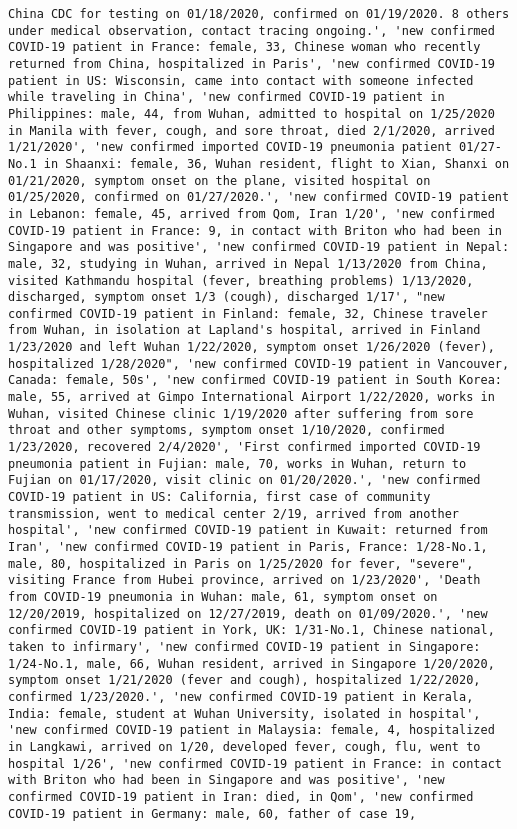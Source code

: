 \documentclass[11pt]{article}
\begin{document}
\begin{Verbatim}[commandchars=\\\{\}]
China CDC for testing on 01/18/2020, confirmed on 01/19/2020. 8 others under medical observation, contact tracing ongoing.', 'new confirmed COVID-19 patient in France: female, 33, Chinese woman who recently returned from China, hospitalized in Paris', 'new confirmed COVID-19 patient in US: Wisconsin, came into contact with someone infected while traveling in China', 'new confirmed COVID-19 patient in Philippines: male, 44, from Wuhan, admitted to hospital on 1/25/2020 in Manila with fever, cough, and sore throat, died 2/1/2020, arrived 1/21/2020', 'new confirmed imported COVID-19 pneumonia patient 01/27-No.1 in Shaanxi: female, 36, Wuhan resident, flight to Xian, Shanxi on 01/21/2020, symptom onset on the plane, visited hospital on 01/25/2020, confirmed on 01/27/2020.', 'new confirmed COVID-19 patient in Lebanon: female, 45, arrived from Qom, Iran 1/20', 'new confirmed COVID-19 patient in France: 9, in contact with Briton who had been in Singapore and was positive', 'new confirmed COVID-19 patient in Nepal: male, 32, studying in Wuhan, arrived in Nepal 1/13/2020 from China, visited Kathmandu hospital (fever, breathing problems) 1/13/2020, discharged, symptom onset 1/3 (cough), discharged 1/17', "new confirmed COVID-19 patient in Finland: female, 32, Chinese traveler from Wuhan, in isolation at Lapland's hospital, arrived in Finland 1/23/2020 and left Wuhan 1/22/2020, symptom onset 1/26/2020 (fever), hospitalized 1/28/2020", 'new confirmed COVID-19 patient in Vancouver, Canada: female, 50s', 'new confirmed COVID-19 patient in South Korea: male, 55, arrived at Gimpo International Airport 1/22/2020, works in Wuhan, visited Chinese clinic 1/19/2020 after suffering from sore throat and other symptoms, symptom onset 1/10/2020, confirmed 1/23/2020, recovered 2/4/2020', 'First confirmed imported COVID-19 pneumonia patient in Fujian: male, 70, works in Wuhan, return to Fujian on 01/17/2020, visit clinic on 01/20/2020.', 'new confirmed COVID-19 patient in US: California, first case of community transmission, went to medical center 2/19, arrived from another hospital', 'new confirmed COVID-19 patient in Kuwait: returned from Iran', 'new confirmed COVID-19 patient in Paris, France: 1/28-No.1, male, 80, hospitalized in Paris on 1/25/2020 for fever, "severe", visiting France from Hubei province, arrived on 1/23/2020', 'Death from COVID-19 pneumonia in Wuhan: male, 61, symptom onset on 12/20/2019, hospitalized on 12/27/2019, death on 01/09/2020.', 'new confirmed COVID-19 patient in York, UK: 1/31-No.1, Chinese national, taken to infirmary', 'new confirmed COVID-19 patient in Singapore: 1/24-No.1, male, 66, Wuhan resident, arrived in Singapore 1/20/2020, symptom onset 1/21/2020 (fever and cough), hospitalized 1/22/2020, confirmed 1/23/2020.', 'new confirmed COVID-19 patient in Kerala, India: female, student at Wuhan University, isolated in hospital', 'new confirmed COVID-19 patient in Malaysia: female, 4, hospitalized in Langkawi, arrived on 1/20, developed fever, cough, flu, went to hospital 1/26', 'new confirmed COVID-19 patient in France: in contact with Briton who had been in Singapore and was positive', 'new confirmed COVID-19 patient in Iran: died, in Qom', 'new confirmed COVID-19 patient in Germany: male, 60, father of case 19, 
\end{Verbatim}
\end{document}
